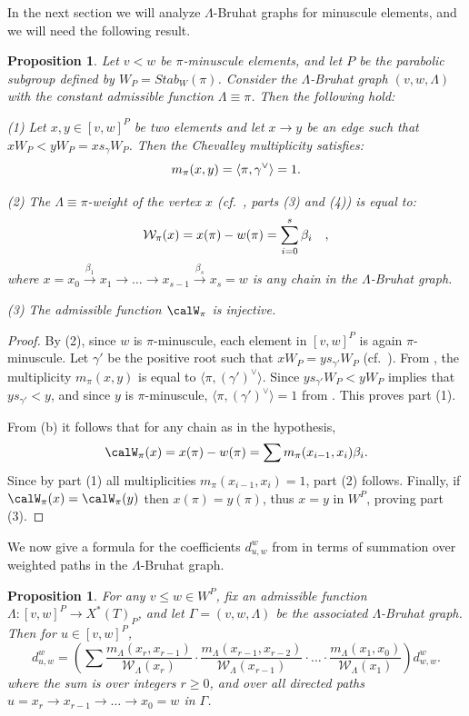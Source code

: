 \documentclass[11pt]{article}
\newtheorem{prop}[theo]{Proposition}
\theoremstyle{definition}
\numberwithin{equation}{section}
\begin{document}
In the next section we will analyze $\Lambda$-Bruhat graphs for minuscule elements, and we will need the following 
result.
\begin{prop}\label{cor:multweight} Let $v < w$ be $\pi$-minuscule elements, and let $P$ be the parabolic 
subgroup defined by $W_P = Stab_W(\pi)$. Consider the 
$\Lambda$-Bruhat graph $(v,w,\Lambda)$ with 
the constant admissible function $\Lambda \equiv \pi$. Then the following hold:

(1) Let $x,y \in [v,w]^P$ be two elements and let $x \to y$ be an edge such that
$x W_P < y W_P = x s_\gamma W_P$. Then the Chevalley multiplicity 
satisfies:
\[ m_\pi(x,y) = \langle \pi, \gamma^\vee \rangle  =1 \/. \] 

(2) The $\Lambda\equiv \pi$-weight of the vertex $x$ (cf.~, parts (3) and (4)) is equal to: 
\[\mathcal{W}_\pi(x) = x(\pi) - w(\pi) = 
\sum_{i=0}^s \beta_i \quad \/, \]
where 
$x=x_0\overset{\beta_1}{\to} x_{1}\to \ldots \to x_{s-1}\overset{\beta_{s}}{\to} x_s =w$ 
is any chain in the $\Lambda$-Bruhat graph.

(3) The admissible function $\calW_\pi$ is injective.
\end{prop}
\begin{proof} By (2), since $w$ is $\pi$-minuscule, each element in 
$[v,w]^P$ is again 
$\pi$-minuscule. Let $\gamma'$ be the positive root such that $xW_P = y s_{\gamma'}W_P$ (cf.~).
From , the multiplicity
$m_\pi(x,y)$ is equal to $\langle \pi, (\gamma')^\vee \rangle$. Since $y s_{\gamma'} W_P < y W_P$ 
implies that $y s_{\gamma'} < y$, and since $y$ is $\pi$-minuscule,
$\langle \pi, (\gamma')^\vee \rangle = 1$ from . This proves part (1). 

From (b) it follows that for any chain as in the hypothesis,
\[\calW_\pi(x) = x(\pi) - w(\pi) = \sum m_\pi(x_{i-1}, x_{i}) \beta_i \/. \]
Since by part (1) all multiplicities $m_\pi(x_{i-1}, x_{i})=1$, part (2) follows.
Finally, if $\calW_\pi(x) = \calW_\pi(y)$ then $x(\pi) = y(\pi)$, thus $x=y$ in $W^P$,
proving part (3).
\end{proof}


We now give a formula for the coefficients $d_{u,w}^w$ from  in terms of summation 
over weighted paths in the $\Lambda$-Bruhat graph. 
\begin{prop}\label{prop:d_P}
For any $v\leq  w\in W^P$, fix an admissible function $\Lambda:[v,w]^P\to X^{*}(T)_P$, 
and let $\Gamma=(v,w,\Lambda)$ be the associated $\Lambda$-Bruhat graph. Then for $u\in [v,w]^P$,
\begin{equation}\label{eq:d}
d_{u,w}^w=\left(
\sum \frac{m_\Lambda(x_{r},x_{r-1})}{\mathcal{W}_\Lambda(x_{r})} \cdot \frac{m_\Lambda(x_{r-1},x_{r-2})}{\mathcal{W}_\Lambda(x_{r-1})}\cdot \ldots \cdot
\frac{m_\Lambda(x_1,x_0)}{\mathcal{W}_\Lambda(x_1)} \right)d_{w,w}^w .
\end{equation} where the sum is over integers $r \ge 0$, and over all directed paths 
$u= x_r \overset{}{\to} x_{r-1} \overset{}{\to} \ldots \overset{}{\to} x_0 = w$ in $\Gamma$. 
\end{prop}
\end{document}
